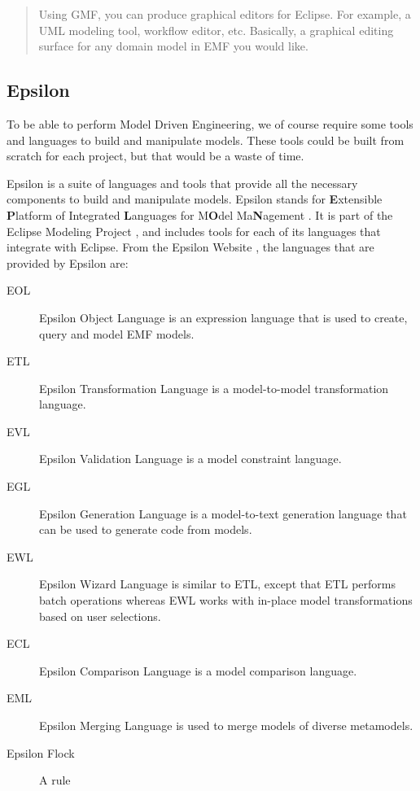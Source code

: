 \begin{quote} Using GMF, you can produce graphical editors for Eclipse. For example, a UML modeling tool, workflow editor, etc. Basically, a graphical editing surface for any domain model in EMF you would like. \end{quote}



\subsection{Epsilon}
To be able to perform Model Driven Engineering, we of course require some tools and languages to build and manipulate models. These tools could be built from scratch for each project, but that would be a waste of time.

Epsilon is a suite of languages and tools that provide all the necessary components to build and manipulate models. Epsilon stands for \textbf{E}xtensible \textbf{P}latform of Integrated \textbf{L}anguages for M\textbf{O}del Ma\textbf{N}agement \citep{epsilonWebsite}. It is part of the Eclipse Modeling Project \citep{ecliplseModelingProjectSite}, and includes tools for each of its languages that integrate with Eclipse. From the Epsilon Website \citep{epsilonWebsite}, the languages that are provided by Epsilon are:

\begin{description}
\item[EOL] Epsilon Object Language is an expression language that is used to create, query and model EMF models.
\item[ETL] Epsilon Transformation Language is a model-to-model transformation language.
\item[EVL] Epsilon Validation Language is a model constraint language.
\item[EGL] Epsilon Generation Language is a model-to-text generation language that can be used to generate code from models.
\item[EWL] Epsilon Wizard Language is similar to ETL, except that ETL performs batch operations whereas EWL works with in-place model transformations based on user selections.
\item[ECL] Epsilon Comparison Language is a model comparison language.
\item[EML] Epsilon Merging Language is used to merge models of diverse metamodels.
\item[Epsilon Flock] A rule
\end{description}

